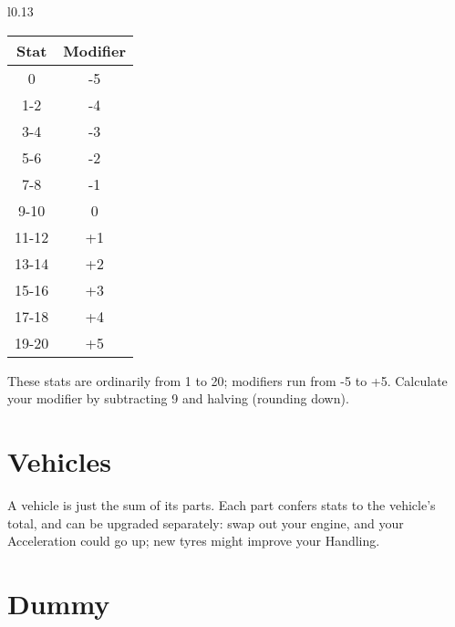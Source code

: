 \documentclass[10pt, a4paper, twocolumn]{article}
\begin{document}
\begin{wraptable}[11]{l}{0.13\textwidth}
\vspace*{-10pt}
\begin{tabular}{cc}
  Stat  & Modifier \\
  \hline 
  0     & -5       \\
  1-2   & -4       \\
  3-4   & -3       \\
  5-6   & -2       \\
  7-8   & -1       \\
  9-10  &  0       \\
  11-12 & +1       \\
  13-14 & +2       \\
  15-16 & +3       \\
  17-18 & +4       \\
  19-20 & +5
\end{tabular}
\vspace*{-10pt}
\end{wraptable}

These stats are ordinarily from 1 to 20; modifiers
run from -5 to +5. Calculate your modifier by subtracting 9 and halving
(rounding down).

\section{Vehicles}
A vehicle is just the sum of its parts. Each part confers stats to the vehicle's
total, and can be upgraded separately: swap out your engine, and your
Acceleration could go up; new tyres might improve your Handling.

\section{Dummy}
\lipsum{}
\end{document}
